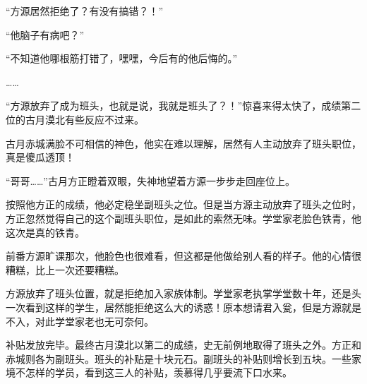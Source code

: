 \begin{this_body}
“方源居然拒绝了？有没有搞错？！”

“他脑子有病吧？”

“不知道他哪根筋打错了，嘿嘿，今后有的他后悔的。”

……

“方源放弃了成为班头，也就是说，我就是班头了？！”惊喜来得太快了，成绩第二位的古月漠北有些反应不过来。

古月赤城满脸不可相信的神色，他实在难以理解，居然有人主动放弃了班头职位，真是傻瓜透顶！

“哥哥……”古月方正瞪着双眼，失神地望着方源一步步走回座位上。

按照他方正的成绩，他必定稳坐副班头之位。但是当方源主动放弃了班头之位时，方正忽然觉得自己的这个副班头职位，是如此的索然无味。学堂家老脸色铁青，他这次是真的铁青。

前番方源旷课那次，他脸色也很难看，但这都是他做给别人看的样子。他的心情很糟糕，比上一次还要糟糕。

方源放弃了班头位置，就是拒绝加入家族体制。学堂家老执掌学堂数十年，还是头一次看到这样的学生，居然能拒绝这么大的诱惑！原本想请君入瓮，但是方源就是不入，对此学堂家老也无可奈何。

补贴发放完毕。最终古月漠北以第二的成绩，史无前例地取得了班头之外。方正和赤城则各为副班头。班头的补贴是十块元石。副班头的补贴则增长到五块。一些家境不怎样的学员，看到这三人的补贴，羡慕得几乎要流下口水来。

\end{this_body}

